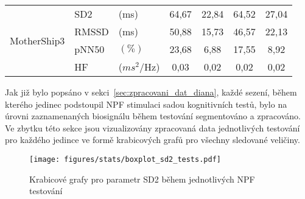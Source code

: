 \begin{table}[h]
\begin{threeparttable}
\begin{tabular*}{\linewidth}{@{\extracolsep{\fill}} lllcccc @{}}
            \multirow[t]{4}{*}{MotherShip3} & SD2                                  & (ms)                           & 64,67                          & 22,84       & 64,52           & 27,04       \\
            & RMSSD                                 & (ms)                           & 50,88                          & 15,73       & 46,57           & 22,13       \\
            & pNN50                                 & $(\%)$                         & 23,68                          & 6,88        & 17,55           & 8,92        \\
            & HF                                    & ($ms^2$/Hz)                    & 0,03                           & 0,02        & 0,02            & 0,02        \\
            \bottomrule
        \end{tabular*}
    \end{threeparttable}
    \label{tab:tests_params_mothership}
\end{table}

Jak již bylo popsáno v sekci~\ref{sec:zpracovani_dat_diana}, každé sezení, během
kterého jedinec podstoupil \gls{NPF} stimulaci sadou kognitivních testů, bylo na
úrovni zaznamenaných biosignálu během testování segmentováno a zpracováno. Ve
zbytku této sekce jsou vizualizovány zpracovaná data jednotlivých testování pro
každého jedince ve formě krabicových grafů pro všechny sledované veličiny.

\begin{figure}[h]
    \begin{center}
        \texttt{[image: figures/stats/boxplot\_sd2\_tests.pdf]}
        \caption{Krabicové grafy pro parametr SD2 během jednotlivých NPF testování}
        \label{fig:results_boxplot_SD2_tests}
    \end{center}
    \vspace{-20mm}
\end{figure}

